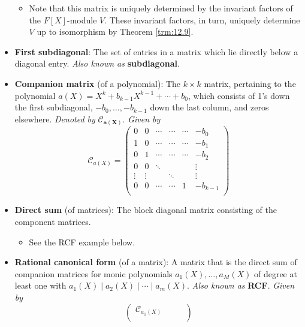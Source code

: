\documentclass[../notes.tex]{subfiles}
\begin{document}
\begin{itemize}
\begin{itemize}
        \item Note that this matrix is uniquely determined by the invariant factors of the $F[X]$-module $V$. These invariant factors, in turn, uniquely determine $V$ up to isomorphism by Theorem \ref{trm:12.9}.
    \end{itemize}
    \item \textbf{First subdiagonal}: The set of entries in a matrix which lie directly below a diagonal entry. \emph{Also known as} \textbf{subdiagonal}.
    \item \textbf{Companion matrix} (of a polynomial): The $k\times k$ matrix, pertaining to the polynomial $a(X)=X^k+b_{k-1}X^{k-1}+\cdots+b_0$, which consists of 1's down the first subdiagonal, $-b_0,\dots,-b_{k-1}$ down the last column, and zeros elsewhere. \emph{Denoted by} $\bm{\mathcal{C}_{a(X)}}$. \emph{Given by}
    \begin{equation*}
        \mathcal{C}_{a(X)} =
        \begin{pmatrix}
            0      & 0      & \cdots & \cdots & \cdots & -b_0\\
            1      & 0      & \cdots & \cdots & \cdots & -b_1\\
            0      & 1      & \cdots & \cdots & \cdots & -b_2\\
            0      & 0      & \ddots &        &        & \vdots\\
            \vdots & \vdots &        & \ddots &        & \vdots\\
            0      & 0      & \cdots & \cdots & 1      & -b_{k-1}\\
        \end{pmatrix}
    \end{equation*}
    \item \textbf{Direct sum} (of matrices): The block diagonal matrix consisting of the component matrices.
    \begin{itemize}
        \item See the RCF example below.
    \end{itemize}
    \item \textbf{Rational canonical form} (of a matrix): A matrix that is the direct sum of companion matrices for monic polynomials $a_1(X),\dots,a_M(X)$ of degree at least one with $a_1(X)\mid a_2(X)\mid\cdots\mid a_m(X)$. \emph{Also known as} \textbf{RCF}. \emph{Given by}
    \begin{equation*}
        \begin{pmatrix}
            \mathcal{C}_{a_1(X)} &  &  & \\

\end{pmatrix}
\end{equation*}
\end{itemize}
\end{document}
